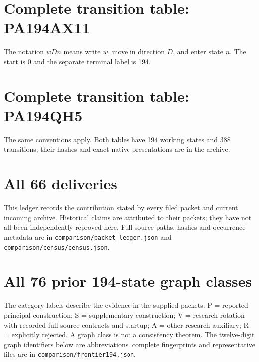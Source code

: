 \documentclass[11pt,letterpaper]{article}
\newcommand{\file}[1]{\nolinkurl{#1}}
\begin{document}
\appendix


\clearpage
\section{Complete transition table: PA194AX11}
\label{app:tableax}
The notation $wDn$ means write $w$, move in direction $D$, and enter state
$n$. The start is 0 and the separate terminal label is 194.


\clearpage
\section{Complete transition table: PA194QH5}
\label{app:tableqh}
The same conventions apply. Both tables have 194 working states and 388
transitions; their hashes and exact native presentations are in the archive.


\clearpage
\section{All 66 deliveries}
\label{app:packets}
This ledger records the contribution stated by every filed packet and
current incoming archive. Historical claims are attributed to their
packets; they have not all been independently reproved here. Full source
paths, hashes and occurrence metadata are in
\file{comparison/packet_ledger.json} and \file{comparison/census/census.json}.


\clearpage
\section{All 76 prior 194-state graph classes}
\label{app:frontier}
The category labels describe the evidence in the supplied packets:
P = reported principal construction; S = supplementary construction;
V = research rotation with recorded full source contracts and startup;
A = other research auxiliary; R = explicitly rejected. A graph class
is not a consistency theorem. The twelve-digit graph identifiers below
are abbreviations; complete fingerprints and representative files are
in \file{comparison/frontier194.json}.

\end{document}
